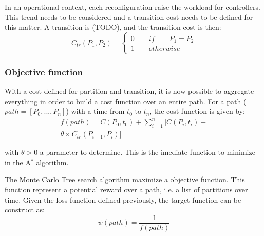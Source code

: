 \documentclass[twoside,twocolumn]{article}
\begin{document}
In an operational context, each reconfiguration raise the workload for
controllers. This trend needs to be considered and a transition cost needs to
be defined for this matter. A transition is (TODO), and the transition cost is
then:
\begin{equation}
  C_{tr}(P_1, P_2) =
\left\{
\begin{array}{l}
    0 \qquad if \qquad P_1 = P_2 \\
    1 \qquad otherwise
\end{array}
\right.
\end{equation}

\subsubsection{Objective function}

With a cost defined for partition and transition, it is now possible to
aggregate everything in order to build a cost function over an entire
path. For a path ($path = [P_0, ..., P_n]$) with a time from $t_0$ to $t_n$,
the cost function is given by:
\begin{equation}
  \begin{split}
  f(path) = C(P_0, t_0) + \sum_{i = 1}^{n} [C(P_i, t_i) +\\ \theta \times C_{tr}(P_{i-1}, P_i)]   
  \end{split}
\end{equation}

with $\theta > 0$ a parameter to determine.
This is the imediate function to minimize in the A$^*$ algorithm.

The Monte Carlo Tree search algorithm maximize a objective function. This function
represent a potential reward over a path, i.e. a list of partitions over time.
Given the loss function defined previously, the target function can be
construct as:
\begin{equation}
  \psi(path) = \frac{1}{f(path)}
\end{equation}








\end{document}
